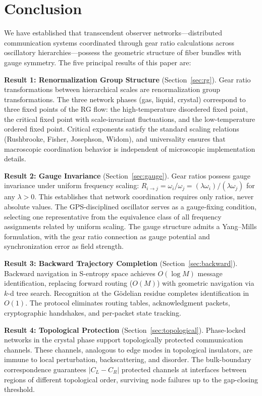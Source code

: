 \documentclass[11pt,twocolumn,a4paper]{article}
\theoremstyle{definition}
\newcommand{\Rij}{R_{i \to j}}
\begin{document}
\section{Conclusion}\label{sec:conclusion}

We have established that transcendent observer networks---distributed communication
systems coordinated through gear ratio calculations across oscillatory hierarchies---possess
the geometric structure of fiber bundles with gauge symmetry. The five principal results
of this paper are:

\textbf{Result 1: Renormalization Group Structure} (Section~\ref{sec:rg}).
Gear ratio transformations between hierarchical scales are renormalization group
transformations. The three network phases (gas, liquid, crystal) correspond to three
fixed points of the RG flow: the high-temperature disordered fixed point, the critical
fixed point with scale-invariant fluctuations, and the low-temperature ordered fixed
point. Critical exponents satisfy the standard scaling relations (Rushbrooke, Fisher,
Josephson, Widom), and universality ensures that macroscopic coordination behavior is
independent of microscopic implementation details.

\textbf{Result 2: Gauge Invariance} (Section~\ref{sec:gauge}).
Gear ratios possess gauge invariance under uniform frequency scaling:
$\Rij = \omega_i/\omega_j = (\lambda\omega_i)/(\lambda\omega_j)$ for any $\lambda > 0$.
This establishes that network coordination requires only ratios, never absolute values.
The GPS-disciplined oscillator serves as a gauge-fixing condition, selecting one
representative from the equivalence class of all frequency assignments related by uniform
scaling. The gauge structure admits a Yang--Mills formulation, with the gear ratio
connection as gauge potential and synchronization error as field strength.

\textbf{Result 3: Backward Trajectory Completion} (Section~\ref{sec:backward}).
Backward navigation in S-entropy space achieves $O(\log M)$ message identification,
replacing forward routing ($O(M)$) with geometric navigation via $k$-d tree search.
Recognition at the G\"odelian residue completes identification in $O(1)$. The protocol
eliminates routing tables, acknowledgment packets, cryptographic handshakes, and
per-packet state tracking.

\textbf{Result 4: Topological Protection} (Section~\ref{sec:topological}).
Phase-locked networks in the crystal phase support topologically protected communication
channels. These channels, analogous to edge modes in topological insulators, are immune
to local perturbation, backscattering, and disorder. The bulk-boundary correspondence
guarantees $|C_L - C_R|$ protected channels at interfaces between regions of different
topological order, surviving node failures up to the gap-closing threshold.
\end{document}

